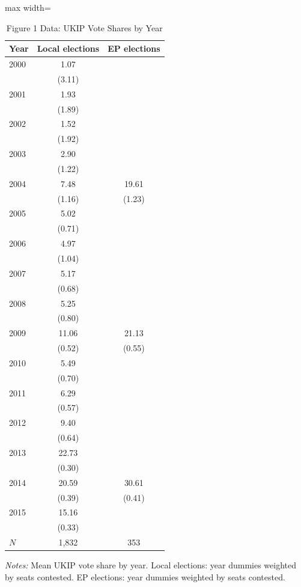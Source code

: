 \begin{table}[htbp]
\centering
\caption{Figure 1 Data: UKIP Vote Shares by Year}
\label{tab:fetzer_fig1}
\begin{adjustbox}{max width=\textwidth}
\begin{tabular}{lcc}
\toprule
Year & Local elections & EP elections \\
\midrule
2000 & 1.07 &  \\
 & (3.11) &  \\
2001 & 1.93 &  \\
 & (1.89) &  \\
2002 & 1.52 &  \\
 & (1.92) &  \\
2003 & 2.90 &  \\
 & (1.22) &  \\
2004 & 7.48 & 19.61 \\
 & (1.16) & (1.23) \\
2005 & 5.02 &  \\
 & (0.71) &  \\
2006 & 4.97 &  \\
 & (1.04) &  \\
2007 & 5.17 &  \\
 & (0.68) &  \\
2008 & 5.25 &  \\
 & (0.80) &  \\
2009 & 11.06 & 21.13 \\
 & (0.52) & (0.55) \\
2010 & 5.49 &  \\
 & (0.70) &  \\
2011 & 6.29 &  \\
 & (0.57) &  \\
2012 & 9.40 &  \\
 & (0.64) &  \\
2013 & 22.73 &  \\
 & (0.30) &  \\
2014 & 20.59 & 30.61 \\
 & (0.39) & (0.41) \\
2015 & 15.16 &  \\
 & (0.33) &  \\
\midrule
$N$ & 1,832 & 353 \\
\bottomrule
\end{tabular}
\end{adjustbox}
\parbox{\textwidth}{\footnotesize\textit{Notes:} Mean UKIP vote share by year. Local elections: year dummies weighted by seats contested. EP elections: year dummies weighted by seats contested.}
\end{table}